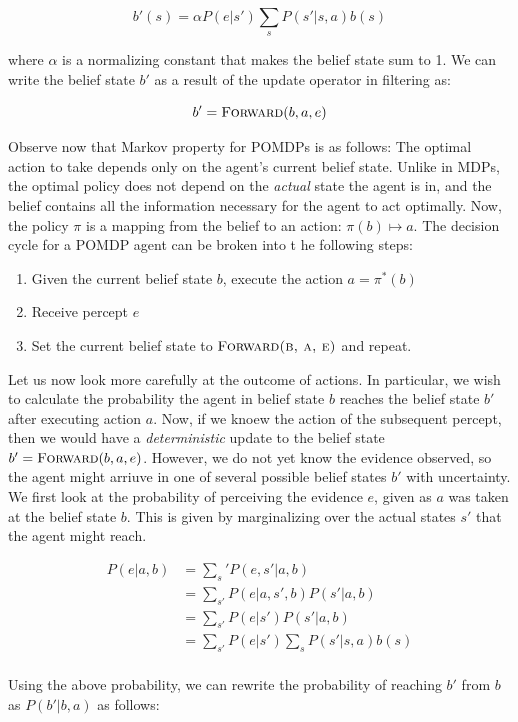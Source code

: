 \documentclass[11pt]{article}
\begin{document}
$$
b'(s) = \alpha P(e|s') \sum_s P(s'|s, a)b(s)
$$

where $\alpha$ is a normalizing constant that makes the belief state sum to 1. We can write the belief state $b'$ as a result of the update operator in filtering as:

$$
b' = \textsc{Forward}(b, a, e)
$$

Observe now that Markov property for POMDPs is as follows: The optimal action to take depends only on the agent's current belief state. Unlike in MDPs, the optimal policy does not depend on the \textit{actual} state the agent is in, and the belief contains all the information necessary for the agent to act optimally. Now, the policy $\pi$ is a mapping from the belief to an action: $\pi(b) \mapsto a$. The decision cycle for a POMDP agent can be broken into t he following steps:

\begin{enumerate}
    \item Given the current belief state $b$, execute the action $a = \pi^*(b)$
    \item Receive percept $e$
    \item Set the current belief state to $\textsc{Forward(b, a, e)}$ and repeat.
\end{enumerate}

Let us now look more carefully at the outcome of actions. In particular, we wish to calculate the probability the agent in belief state $b$ reaches the belief state $b'$ after executing action $a$. Now, if we knoew the action of the subsequent percept, then we would have a \textit{deterministic} update to the belief state $b' = \textsc{Forward}(b, a, e)$. However, we do not yet know the evidence observed, so the agent might arriuve in one of several possible belief states $b'$ with uncertainty. We first look at the probability of perceiving the evidence $e$, given as $a$ was taken at the belief state $b$. This is given by marginalizing over the actual states $s'$ that the agent might reach.

$$
\begin{aligned}
P(e|a, b) &= \sum_s' P(e, s'|a, b)\\
&= \sum_{s'} P(e|a, s', b)P(s'|a, b)\\
&= \sum_{s'} P(e|s')P(s'|a, b)\\
&= \sum_{s'} P(e|s') \sum_s P(s' | s, a)b(s)\\
\end{aligned}
$$

Using the above probability, we can rewrite the probability of reaching $b'$ from $b$ as $P(b'|b, a)$ as follows:
\end{document}
